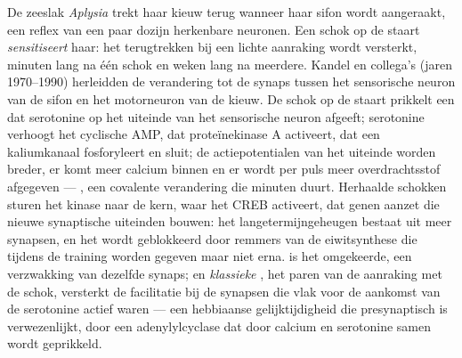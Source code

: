\begin{proposition}\label{prop:b3:learning-memory:aplysia}
De zeeslak \emph{Aplysia} trekt haar kieuw terug wanneer haar sifon
wordt aangeraakt, een reflex van een paar dozijn herkenbare neuronen.
Een schok op de staart \emph{sensitiseert} haar: het terugtrekken bij
een lichte aanraking wordt versterkt, minuten lang na één schok en
weken lang na meerdere. Kandel en collega's (jaren 1970--1990)
herleidden de verandering tot de synaps tussen het sensorische neuron
van de sifon en het motorneuron van de kieuw. De schok op de staart
prikkelt een  dat serotonine op het uiteinde van het
sensorische neuron afgeeft; serotonine verhoogt het cyclische AMP, dat
proteïnekinase A activeert, dat een kaliumkanaal fosforyleert en
sluit; de actiepotentialen van het uiteinde worden breder, er komt meer
calcium binnen en er wordt per puls meer overdrachtsstof afgegeven ---
\emph{}, een covalente verandering die
minuten duurt. Herhaalde schokken sturen het kinase naar de kern, waar
het CREB activeert, dat genen aanzet die nieuwe synaptische uiteinden
bouwen: het langetermijngeheugen bestaat uit meer synapsen, en het
wordt geblokkeerd door remmers van de eiwitsynthese die tijdens de
training worden gegeven maar niet erna. \emph{} is het
omgekeerde, een verzwakking van dezelfde synaps; en \emph{klassieke
}, het paren van de aanraking met de schok, versterkt de
facilitatie bij de synapsen die vlak voor de aankomst van de serotonine
actief waren --- een hebbiaanse gelijktijdigheid die presynaptisch is
verwezenlijkt, door een adenylylcyclase dat door calcium en serotonine
samen wordt geprikkeld.
\end{proposition}

